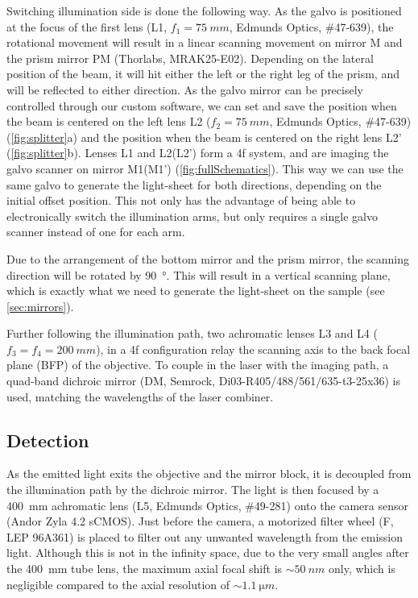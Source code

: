     Switching illumination side is done the following way. As the galvo is positioned at the focus of the first lens (L1, $f_1 = \SI{75}{mm}$, Edmunds Optics, \#47-639), the rotational movement will result in a linear scanning movement on mirror M and the prism mirror PM (Thorlabs, MRAK25-E02). Depending on the lateral position of the beam, it will hit either the left or the right leg of the prism, and will be reflected to either direction. As the galvo mirror can be precisely controlled through our custom software, we can set and save the position when the beam is centered on the left lens L2 ($f_2 = \SI{75}{mm}$, Edmunds Optics, \#47-639) (\autoref{fig:splitter}a) and the position when the beam is centered on the right lens L2' (\autoref{fig:splitter}b). Lenses L1 and L2(L2') form a 4f system, and are imaging the galvo scanner on mirror M1(M1') (\autoref{fig:fullSchematics}). This way we can use the same galvo to generate the light-sheet for both directions, depending on the initial offset position. This not only has the advantage of being able to electronically switch the illumination arms, but only requires a single galvo scanner instead of one for each arm.
    
    Due to the arrangement of the bottom mirror and the prism mirror, the scanning direction will be rotated by \SI{90}{\degree}. This will result in a vertical scanning plane, which is exactly what we need to generate the light-sheet on the sample (see \autoref{sec:mirrors}).

    Further following the illumination path, two achromatic lenses L3 and L4 ($f_3 = f_4 = \SI{200}{mm}$), in a 4f configuration relay the scanning axis to the back focal plane (BFP) of the objective. To couple in the laser with the imaging path, a quad-band dichroic mirror (DM, Semrock, Di03-R405/488/561/635-t3-25x36) is used, matching the wavelengths of the laser combiner.

  \subsection{Detection}
    As the emitted light exits the objective and the mirror block, it is decoupled from the illumination path by the dichroic mirror. The light is then focused by a \SI{400}{mm} achromatic lens (L5, Edmunds Optics, \#49-281) onto the camera sensor (Andor Zyla 4.2 sCMOS). Just before the camera, a motorized filter wheel (F, LEP 96A361) is placed to filter out any unwanted wavelength from the emission light. Although this is not in the infinity space, due to the very small angles after the \SI{400}{mm} tube lens, the maximum axial focal shift is $\sim \SI{50}{nm}$ only, which is negligible compared to the axial resolution of $\sim \SI{1.1}{\micro m}$.

